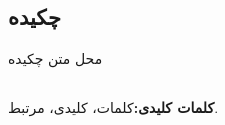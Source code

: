 \documentclass[12pt]{report}
\begin{document}
	\pagestyle{empty}
	\pagenumbering{}
	
	\newpage
	\pagestyle{plain}
	\setcounter{page}{1}
	
	
	\chapter*{}
	\section*{چکیده}
	محل متن چکیده
	
	\section*{}
	\textbf{کلمات کلیدی:}\quad کلمات، کلیدی، مرتبط.
	
	
	
	
\end{document}
